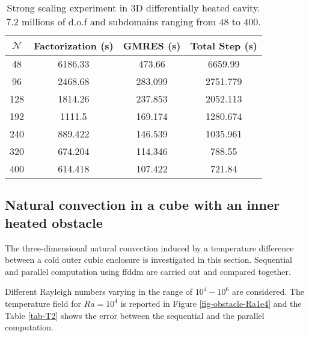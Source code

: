 \begin{table}[!h]
	\begin{center}
		\begin{tabular}{cccc}
			 $\mathcal{N}$ & Factorization (s)  & GMRES (s)  & Total Step (s) \\ \hline \hline
			 48 & 6186.33  & 473.66  &  6659.99 \\
			 96 & 2468.68  & 283.099 &  2751.779 \\
			 128 & 1814.26 &  237.853 &   2052.113\\
			 192 & 1111.5  &   169.174 &  1280.674 \\
			 240 & 889.422  & 146.539 &  1035.961\\
			 320 & 674.204   &  114.346 & 788.55 \\
			 400 & 614.418  &  107.422 &  721.84\\ \hline
		\end{tabular}
	\end{center}
	\caption {Strong scaling experiment in 3D differentially heated cavity. $7.2$ millions of d.o.f and subdomains ranging from $48$ to $400$. }
	\label{tab-scalability}
\end{table}



\subsection{Natural convection in a cube with an inner heated obstacle}\label{sub-OBSTACLE-3D}

The three-dimensional natural convection induced by a temperature difference between a cold outer cubic enclosure is investigated in this section.
Sequential and parallel computation using ffddm are carried out and compared together.

Different Rayleigh numbers varying in the range of $10^4 -10^6$ are considered. The temperature field for $Ra = 10^4$ is reported in Figure \ref{fig-obstacle-Ra1e4} and the Table \ref{tab-T2} shows the error between the sequential and the parallel computation.

